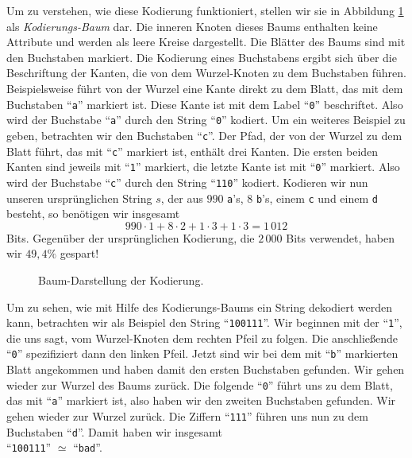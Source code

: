 Um zu verstehen, wie diese Kodierung funktioniert, stellen wir sie in
Abbildung \ref{fig:coding-tree} als \emph{Kodierungs-Baum} dar.  Die inneren 
Knoten dieses Baums enthalten keine Attribute und werden als leere Kreise dargestellt.
Die Bl\"atter des Baums sind mit den Buchstaben markiert.
Die Kodierung eines Buchstabens ergibt sich \"uber die Beschriftung der Kanten, die von dem
Wurzel-Knoten zu dem Buchstaben f\"uhren.  Beispielsweise f\"uhrt von der Wurzel eine
Kante direkt zu dem Blatt, das mit dem Buchstaben ``\texttt{a}'' markiert ist.  Diese
Kante ist mit dem Label ``\texttt{0}'' beschriftet.  Also wird der Buchstabe
``\texttt{a}'' durch den String ``\texttt{0}'' kodiert.  Um ein weiteres Beispiel zu
geben, betrachten wir den Buchstaben ``\texttt{c}''.   Der Pfad, der von der Wurzel zu dem
Blatt f\"uhrt, das mit ``\texttt{c}'' markiert ist, enth\"alt drei Kanten.  Die ersten beiden
Kanten sind jeweils mit ``\texttt{1}'' markiert, die letzte Kante ist mit ``\texttt{0}''
markiert.  Also wird der Buchstabe ``\texttt{c}'' durch den String ``\texttt{110}''
kodiert.  Kodieren wir nun unseren urspr\"unglichen String $s$, der aus $990$
\texttt{a}'s, $8$ \texttt{b}'s, einem \texttt{c} und einem \texttt{d} besteht, so
ben\"otigen wir insgesamt
\[ 990 \cdot 1 + 8 \cdot 2 + 1 \cdot 3 + 1 \cdot 3 = 1\,012 \]
Bits.  Gegen\"uber der urspr\"unglichen Kodierung, die $2\,000$ Bits verwendet, haben wir $49,4\%$
gespart!

\begin{figure}[!ht]
  \centering
  \caption{Baum-Darstellung der Kodierung.}
  \label{fig:coding-tree}
\end{figure}

Um zu sehen, wie mit Hilfe des Kodierungs-Baums ein String dekodiert werden kann,
betrachten wir als Beispiel den String ``\texttt{100111}''.  Wir beginnen mit der
``\texttt{1}'', die uns sagt, vom Wurzel-Knoten dem rechten Pfeil zu folgen.  Die
anschlie{\ss}ende ``\texttt{0}'' spezifiziert dann den linken Pfeil.  Jetzt sind wir bei dem
mit ``\texttt{b}'' markierten Blatt angekommen und haben damit den ersten Buchstaben
gefunden.  Wir gehen wieder zur Wurzel des Baums zur\"uck. Die folgende ``\texttt{0}'' f\"uhrt
uns zu dem Blatt, das mit ``\texttt{a}'' markiert ist, also haben wir den zweiten
Buchstaben gefunden. Wir gehen wieder zur Wurzel zur\"uck.  Die Ziffern ``\texttt{111}''
f\"uhren uns nun zu dem Buchstaben ``\texttt{d}''.  Damit haben wir insgesamt
\\[0.2cm]
\hspace*{1.3cm}
``\texttt{100111}'' $\simeq$ ``\texttt{bad}''.


